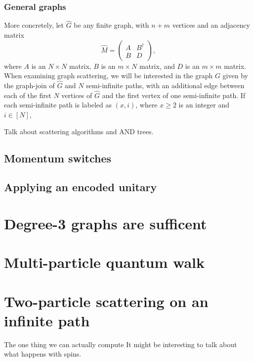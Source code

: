 \subsubsection{General graphs}


More concretely, let $\widehat{G}$ be any finite graph, with $n+m$ vertices and an adjacency matrix
\begin{equation}
  \widehat{M} = \begin{pmatrix}A & B^\dag\\ B & D\end{pmatrix},
\end{equation}
where $A$ is an $N\times N$ matrix, $B$ is an $m\times N$ matrix, and $D$ is an $m\times m$ matrix.  When examining graph scattering, we will be interested in the graph $G$ given by the graph-join of $\widehat{G}$ and $N$ semi-infinite paths, with an additional edge between each of the first $N$ vertices of $\widehat{G}$ and the first vertex of one semi-infinite path.  If each semi-infinite path is labeled as $(x,i)$, where $x\geq 2$ is an integer and $i\in[N]$, 



Talk about scattering algorithms and AND trees.

\subsection{Momentum switches}

\subsection{Applying an encoded unitary}

\section{Degree-3 graphs are sufficent}

\section{Multi-particle quantum walk}

\section{Two-particle scattering on an infinite path}

The one thing we can actually compute
It might be interesting to talk about what happens with spins.
